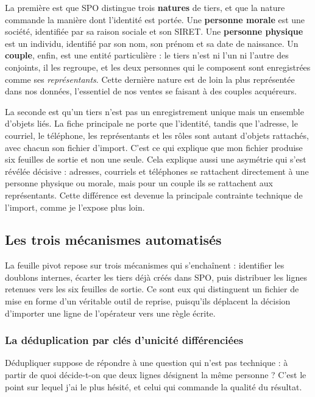La première est que SPO distingue trois \textbf{natures} de tiers, et que la nature commande la
manière dont l'identité est portée. Une \textbf{personne morale} est une société, identifiée par
sa raison sociale et son SIRET. Une \textbf{personne physique} est un individu, identifié par
son nom, son prénom et sa date de naissance. Un \textbf{couple}, enfin, est une entité
particulière : le tiers n'est ni l'un ni l'autre des conjoints, il les regroupe, et les deux
personnes qui le composent sont enregistrées comme ses \emph{représentants}. Cette dernière
nature est de loin la plus représentée dans nos données, l'essentiel de nos ventes se faisant à
des couples acquéreurs.

La seconde est qu'un tiers n'est pas un enregistrement unique mais un ensemble d'objets liés.
La fiche principale ne porte que l'identité, tandis que l'adresse, le courriel, le téléphone,
les représentants et les rôles sont autant d'objets rattachés, avec chacun son fichier
d'import. C'est ce qui explique que mon fichier produise six feuilles de sortie et non une
seule. Cela explique aussi une asymétrie qui s'est révélée décisive : adresses, courriels et
téléphones se rattachent directement à une personne physique ou morale, mais pour un couple ils
se rattachent aux représentants. Cette différence est devenue la principale contrainte
technique de l'import, comme je l'expose plus loin.

\subsection{Les trois mécanismes automatisés}

La feuille pivot repose sur trois mécanismes qui s'enchaînent : identifier les doublons
internes, écarter les tiers déjà créés dans SPO, puis distribuer les lignes retenues vers les
six feuilles de sortie. Ce sont eux qui distinguent un fichier de mise en forme d'un véritable
outil de reprise, puisqu'ils déplacent la décision d'importer une ligne de l'opérateur vers une
règle écrite.

\subsubsection{La déduplication par clés d'unicité différenciées}

Dédupliquer suppose de répondre à une question qui n'est pas technique : à partir de quoi
décide-t-on que deux lignes désignent la même personne ? C'est le point sur lequel j'ai le plus
hésité, et celui qui commande la qualité du résultat.

